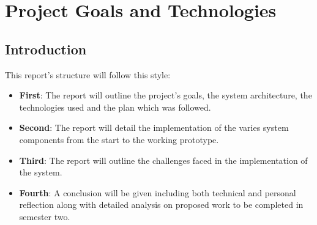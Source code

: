 \chapter{Project Goals and Technologies}
\label{chap:intro}


\section{Introduction}
\begin{flushleft}
	This report's structure will follow this style:
	\begin{itemize}
		\item \textbf{First}: The report will outline the project's goals, the system architecture, the technologies used and the plan which was followed.
		\item \textbf{Second}: The report will detail the implementation of the varies system components from the start to the working prototype.
		\item \textbf{Third}: The report will outline the challenges faced in the implementation of the system.
		\item \textbf{Fourth}: A conclusion will be given including both technical and personal reflection along with detailed analysis on proposed work to be completed in
		      semester two.
	\end{itemize}

\end{flushleft}
